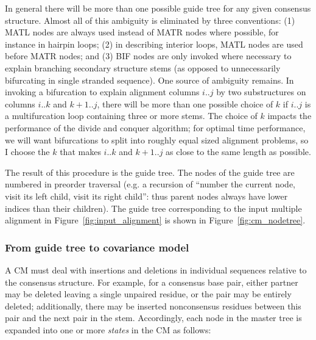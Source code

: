 In general there will be more than one possible guide tree for any
given consensus structure. Almost all of this ambiguity is eliminated
by three conventions: (1) MATL nodes are always used instead of MATR
nodes where possible, for instance in hairpin loops; (2) in describing
interior loops, MATL nodes are used before MATR nodes; and (3) BIF
nodes are only invoked where necessary to explain branching secondary
structure stems (as opposed to unnecessarily bifurcating in single
stranded sequence). One source of ambiguity remains. In invoking a
bifurcation to explain alignment columns $i..j$ by two substructures
on columns $i..k$ and $k+1..j$, there will be more than one possible
choice of $k$ if $i..j$ is a multifurcation loop containing three or
more stems. The choice of $k$ impacts the performance of the divide
and conquer algorithm; for optimal time performance, we will want
bifurcations to split into roughly equal sized alignment problems, so
I choose the $k$ that makes $i..k$ and $k+1..j$ as close to the same
length as possible.

The result of this procedure is the guide tree. The nodes of the guide
tree are numbered in preorder traversal (e.g. a recursion of ``number
the current node, visit its left child, visit its right child'': thus
parent nodes always have lower indices than their children). The guide
tree corresponding to the input multiple alignment in
Figure~\ref{fig:input_alignment} is shown in
Figure~\ref{fig:cm_nodetree}.

\subsubsection{From guide tree to covariance model}

A CM must deal with insertions and deletions in individual sequences
relative to the consensus structure. For example, for a consensus base
pair, either partner may be deleted leaving a single unpaired residue,
or the pair may be entirely deleted; additionally, there may be
inserted nonconsensus residues between this pair and the next pair in
the stem. Accordingly, each node in the master tree is expanded into
one or more \emph{states} in the CM as follows:

